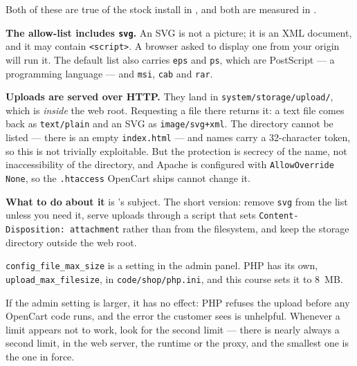 \begin{alertbox}
Both of these are true of the stock install in , and both are
measured in .

\smallskip
\textbf{The allow-list includes \texttt{svg}.} An SVG is not a picture; it is
an XML document, and it may contain \texttt{<script>}. A browser asked to
display one from your origin will run it. The default list also carries
\texttt{eps} and \texttt{ps}, which are PostScript --- a programming language
--- and \texttt{msi}, \texttt{cab} and \texttt{rar}.

\smallskip
\textbf{Uploads are served over HTTP.} They land in
\texttt{system/storage/upload/}, which is \emph{inside} the web root. Requesting
a file there returns it: a text file comes back as \texttt{text/plain} and an
SVG as \texttt{image/svg+xml}. The directory cannot be listed --- there is an
empty \texttt{index.html} --- and names carry a 32-character token, so this is
not trivially exploitable. But the protection is secrecy of the name, not
inaccessibility of the directory, and Apache is configured with
\texttt{AllowOverride None}, so the \texttt{.htaccess} OpenCart ships cannot
change it.

\smallskip
\textbf{What to do about it} is 's subject. The short version:
remove \texttt{svg} from the list unless you need it, serve uploads through a
script that sets \texttt{Content-Disposition: attachment} rather than from the
filesystem, and keep the storage directory outside the web root.
\end{alertbox}

\begin{conceptbox}
\texttt{config\_file\_max\_size} is a setting in the admin panel. PHP has its
own, \texttt{upload\_max\_filesize}, in \texttt{code/shop/php.ini}, and this
course sets it to 8~MB.

\smallskip
If the admin setting is larger, it has no effect: PHP refuses the upload
before any OpenCart code runs, and the error the customer sees is unhelpful.
Whenever a limit appears not to work, look for the second limit --- there is
nearly always a second limit, in the web server, the runtime or the proxy, and
the smallest one is the one in force.
\end{conceptbox}

